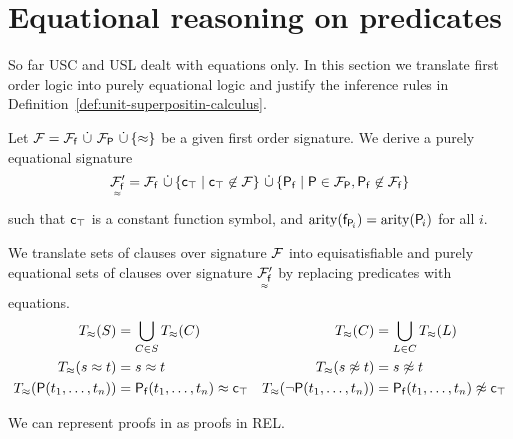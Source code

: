     \section{Equational reasoning on predicates}\label{sec:equational:reasoning:on:predicates}

    So far USC and USL dealt
    with equations only.
    In this section we translate first order logic
    into purely equational logic and
    justify the inference rules in Definition~\vref{def:unit-superpositin-calculus}.

    \begin{definition}
        Let \( \mathcal{F} = {\mathcal{F}_{\mathsf{f}}} \, \mathop{\dot\cup} \, {\mathcal{F}_{\mathsf{P}}} \, \mathop{\dot\cup} \, \{\approx \} \) be a given first order signature.
        We derive a purely equational signature
        \[
            \underset{^\approx}{\mathcal{F}'_{\mathsf{f}}} = {\mathcal{F}_{\mathsf{f}}}
            \, \mathop{\dot\cup} \,
            \{ \mathsf{c}_\top \mid \mathsf{c}_\top\not\in\mathcal{F} \}
            \, \mathop{\dot\cup} \,
            \{ \mathsf{P}_{\mathsf{f}} \mid \mathsf{P} \in {\mathcal{F}_{\mathsf{P}}}, \mathsf{P}_{\mathsf{f}}\not\in{\mathcal{F}_{\mathsf{f}}} \}
            \]
        such that \( \mathsf{c}_\top \) is a constant function symbol,
        and \( \operatorname{arity}(\mathsf{f}_{\mathsf{P}_{\!i}}) = \operatorname{arity}(\mathsf{P}_{\!i}) \) for all \( i \).

    \end{definition}

    \begin{definition}
        We translate sets of clauses over signature \( \mathcal{F} \)
        into equisatisfiable and purely equational sets of clauses over signature
        \( \underset{^\approx}{\mathcal{F}'_{\mathsf{f}}} \)
        by replacing predicates with equations.
        \begin{align*}
            T_\approx(S) &= \bigcup_{C\in S} T_\approx(C) &
            T_\approx(C) &= \bigcup_{L\in C} T_\approx(L) \\
            T_\approx(s\approx t) &= s\approx t &
            T_\approx(s\not\approx t) &= s\not\approx t \\
            T_\approx(\mathsf{P}(t_1,\ldots,t_n)) &= \mathsf{P}_{\mathsf{f}}(t_1,\ldots,t_n)\approx\mathsf{c}_\top &
            T_\approx(\lnot\mathsf{P}(t_1,\ldots,t_n)) &= \mathsf{P}_{\mathsf{f}}(t_1,\ldots,t_n)\not\approx\mathsf{c}_\top
        \end{align*}
    \end{definition}


    \begin{corollary}
        We can represent proofs in \InstGenEQ
        as proofs in REL.
    \end{corollary}

